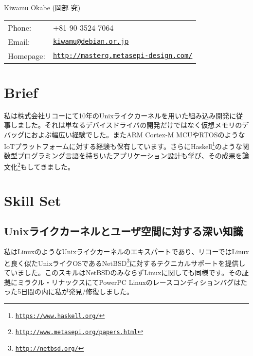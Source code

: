 \documentclass[letterpaper]{article}
\def\name{Kiwamu Okabe (岡部 究)}
\begin{document}
{\huge \name}


\vspace{0.25in}

\begin{minipage}{0.3\linewidth}
  \begin{tabular}{ll}
    Phone: & +81-90-3524-7064 \\
    Email: & \href{mailto:kiwamu@debian.or.jp}{\tt kiwamu@debian.or.jp} \\
    Homepage: & \href{http://masterq.metasepi-design.com/}{\tt http://masterq.metasepi-design.com/} \\
  \end{tabular}
\end{minipage}

\section*{Brief}

私は株式会社リコーにて10年のUnixライクカーネルを用いた組み込み開発に従事しました。それは単なるデバイスドライバの開発だけではなく仮想メモリのデバッグにおよぶ幅広い経験でした。またARM Cortex-M MCUやRTOSのようなIoTプラットフォームに対する経験も保有しています。さらにHaskell\footnote{\href{https://www.haskell.org/}{\tt https://www.haskell.org/}}のような関数型プログラミング言語を持ちいたアプリケーション設計も学び、その成果を論文化\footnote{\href{http://www.metasepi.org/papers.html}{\tt http://www.metasepi.org/papers.html}}もしてきました。

\section*{Skill Set}

\subsection*{Unixライクカーネルとユーザ空間に対する深い知識}

私はLinuxのようなUnixライクカーネルのエキスパートであり、リコーではLinuxと良く似たUnixライクOSであるNetBSD\footnote{\href{http://netbsd.org/}{\tt http://netbsd.org/}}に対するテクニカルサポートを提供していました。このスキルはNetBSDのみならずLinuxに関しても同様です。その証拠にミラクル・リナックスにてPowerPC Linuxのレースコンディションバグはたった5日間の内に私が発見/修復しました。
\end{document}
